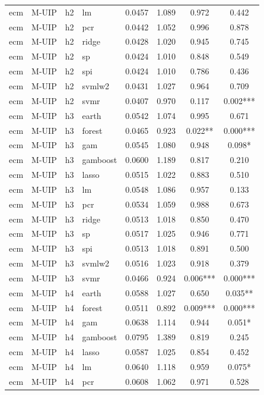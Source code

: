 \begin{ThreePartTable}
\begin{longtable}[t]{llclcccc}
ecm & M-UIP & h2 & lm & 0.0457 & 1.089 & 0.972 & 0.442\\
ecm & M-UIP & h2 & pcr & 0.0442 & 1.052 & 0.996 & 0.878\\
ecm & M-UIP & h2 & ridge & 0.0428 & 1.020 & 0.945 & 0.745\\
ecm & M-UIP & h2 & sp & 0.0424 & 1.010 & 0.848 & 0.549\\
ecm & M-UIP & h2 & spi & 0.0424 & 1.010 & 0.786 & 0.436\\
ecm & M-UIP & h2 & svmlw2 & 0.0431 & 1.027 & 0.964 & 0.709\\
ecm & M-UIP & h2 & svmr & 0.0407 & 0.970 & 0.117 & 0.002***\\
\addlinespace
ecm & M-UIP & h3 & earth & 0.0542 & 1.074 & 0.995 & 0.671\\
ecm & M-UIP & h3 & forest & 0.0465 & 0.923 & 0.022** & 0.000***\\
ecm & M-UIP & h3 & gam & 0.0545 & 1.080 & 0.948 & 0.098*\\
ecm & M-UIP & h3 & gamboost & 0.0600 & 1.189 & 0.817 & 0.210\\
ecm & M-UIP & h3 & lasso & 0.0515 & 1.022 & 0.883 & 0.510\\
ecm & M-UIP & h3 & lm & 0.0548 & 1.086 & 0.957 & 0.133\\
ecm & M-UIP & h3 & pcr & 0.0534 & 1.059 & 0.988 & 0.673\\
ecm & M-UIP & h3 & ridge & 0.0513 & 1.018 & 0.850 & 0.470\\
ecm & M-UIP & h3 & sp & 0.0517 & 1.025 & 0.946 & 0.771\\
ecm & M-UIP & h3 & spi & 0.0513 & 1.018 & 0.891 & 0.500\\
ecm & M-UIP & h3 & svmlw2 & 0.0516 & 1.023 & 0.918 & 0.379\\
ecm & M-UIP & h3 & svmr & 0.0466 & 0.924 & 0.006*** & 0.000***\\
\addlinespace
ecm & M-UIP & h4 & earth & 0.0588 & 1.027 & 0.650 & 0.035**\\
ecm & M-UIP & h4 & forest & 0.0511 & 0.892 & 0.009*** & 0.000***\\
ecm & M-UIP & h4 & gam & 0.0638 & 1.114 & 0.944 & 0.051*\\
ecm & M-UIP & h4 & gamboost & 0.0795 & 1.389 & 0.819 & 0.245\\
ecm & M-UIP & h4 & lasso & 0.0587 & 1.025 & 0.854 & 0.452\\
ecm & M-UIP & h4 & lm & 0.0640 & 1.118 & 0.959 & 0.075*\\
ecm & M-UIP & h4 & pcr & 0.0608 & 1.062 & 0.971 & 0.528\\

\end{longtable}
\end{ThreePartTable}
